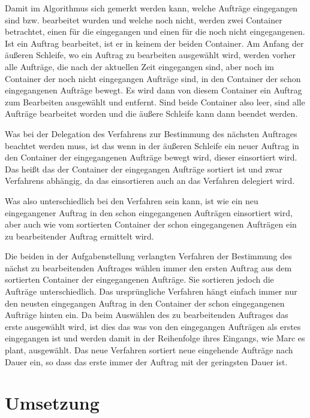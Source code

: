 \documentclass[a4paper,10pt,ngerman]{scrartcl}
\begin{document}
Damit im Algorithmus sich gemerkt werden kann,
welche Aufträge eingegangen sind bzw. bearbeitet wurden
und welche noch nicht, werden zwei Container betrachtet,
einen für die eingegangen und einen für die noch nicht eingegangenen.
Ist ein Auftrag bearbeitet, ist er in keinem der beiden Container.
Am Anfang der äußeren Schleife, wo ein Auftrag zu bearbeiten ausgewählt wird,
werden vorher alle Aufträge,
die nach der aktuellen Zeit eingegangen sind,
aber noch im Container der noch nicht eingegangen Aufträge sind,
in den Container der schon eingegangenen Aufträge bewegt.
Es wird dann von diesem Container ein Auftrag zum Bearbeiten ausgewählt und entfernt.
Sind beide Container also leer, sind alle Aufträge bearbeitet worden
und die äußere Schleife kann dann beendet werden.

Was bei der Delegation des Verfahrens zur Bestimmung des nächsten Auftrages beachtet werden muss,
ist das wenn in der äußeren Schleife ein neuer Auftrag in den Container der eingegangenen Aufträge bewegt wird,
dieser einsortiert wird. Das heißt das der Container der eingegangen Aufträge sortiert ist
und zwar Verfahrens abhängig,
da das einsortieren auch an das Verfahren delegiert wird.

Was also unterschiedlich bei den Verfahren sein kann, ist wie ein neu eingegangener Auftrag
in den schon eingegangenen Aufträgen einsortiert wird,
aber auch wie vom sortierten Container der schon eingegangenen Aufträgen
ein zu bearbeitender Auftrag ermittelt wird.

Die beiden in der Aufgabenstellung verlangten Verfahren der Bestimmung
des nächst zu bearbeitenden Auftrages wählen immer den ersten Auftrag
aus dem sortierten Container der eingegangenen Aufträge.
Sie sortieren jedoch die Aufträge unterschiedlich.
Das ursprüngliche Verfahren hängt einfach immer nur den neusten eingegangen Auftrag
in den Container der schon eingegangenen Aufträge hinten ein.
Da beim Auswählen des zu bearbeitenden Auftrages das erste ausgewählt wird,
ist dies das was von den eingegangen Aufträgen als erstes eingegangen ist
und werden damit in der Reihenfolge ihres Eingangs, wie Marc es plant, ausgewählt.
Das neue Verfahren sortiert neue eingehende Aufträge nach Dauer ein,
so dass das erste immer der Auftrag mit der geringsten Dauer ist.


\section{Umsetzung}\label{sec:umsetzung}
\end{document}
